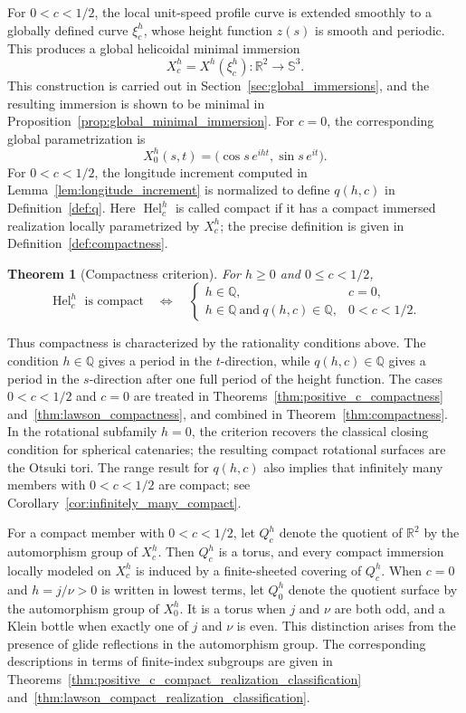 \documentclass[a4paper,11pt]{amsart}
\numberwithin{equation}{section}
\theoremstyle{plain}
\newtheorem{mainthm}{Theorem}
\begin{document}
For $0<c<1/2$, the local unit-speed profile curve is extended smoothly
to a globally defined curve $\xi_c^h$, whose height function $z(s)$ is
smooth and periodic. This produces a
global helicoidal minimal immersion
\[
X_c^h=X^h(\xi_c^h):
\mathbb R^2\longrightarrow\mathbb S^3.
\]
This construction is carried out in
Section~\ref{sec:global_immersions}, and the resulting immersion is shown
to be minimal in Proposition~\ref{prop:global_minimal_immersion}. For $c=0$, the
corresponding global parametrization is
\[
X_0^h(s,t)
=
\bigl(\cos s\,e^{iht},\sin s\,e^{it}\bigr).
\]
For $0<c<1/2$, the longitude increment computed in
Lemma~\ref{lem:longitude_increment} is normalized to define $q(h,c)$
in Definition~\ref{def:q}. Here $\operatorname{Hel}_c^h$ is called compact if it has a compact
immersed realization locally parametrized by $X_c^h$; the precise
definition is given in Definition~\ref{def:compactness}.

\begin{mainthm}[Compactness criterion]\label{mainthm:compactness}
For $h\geq0$ and $0\leq c<1/2$,
\[
\operatorname{Hel}_c^h \text{ is compact}
\quad\Longleftrightarrow\quad
\begin{cases}
h\in\mathbb Q,
& c=0,\\[1mm]
h\in\mathbb Q\ \text{and}\ q(h,c)\in\mathbb Q,
& 0<c<1/2.
\end{cases}
\]
\end{mainthm}

Thus compactness is characterized by the rationality conditions above.
The condition $h\in\mathbb Q$ gives a period in the $t$-direction,
while $q(h,c)\in\mathbb Q$ gives a period in the $s$-direction
after one full period of the height function. The cases $0<c<1/2$ and
$c=0$ are treated in Theorems~\ref{thm:positive_c_compactness}
and~\ref{thm:lawson_compactness}, and combined in
Theorem~\ref{thm:compactness}. In the rotational subfamily $h=0$, the
criterion recovers the classical closing condition for spherical
catenaries; the resulting compact rotational surfaces are the Otsuki
tori. The range result for $q(h,c)$ also implies that infinitely many
members with $0<c<1/2$ are compact; see
Corollary~\ref{cor:infinitely_many_compact}.

For a compact member with $0<c<1/2$, let $Q_c^h$ denote the quotient
of $\mathbb R^2$ by the automorphism group of $X_c^h$. Then $Q_c^h$ is
a torus, and every compact immersion locally modeled on $X_c^h$ is
induced by a finite-sheeted covering of $Q_c^h$. When $c=0$ and
$h=j/\nu>0$ is written in lowest terms, let $Q_0^h$ denote the quotient
surface by the automorphism group of $X_0^h$. It is a torus when $j$
and $\nu$ are both odd, and a Klein bottle when exactly one of $j$ and
$\nu$ is even. This distinction arises from the presence of glide
reflections in the automorphism group. The corresponding descriptions
in terms of finite-index subgroups are given in
Theorems~\ref{thm:positive_c_compact_realization_classification}
and~\ref{thm:lawson_compact_realization_classification}.
\end{document}
